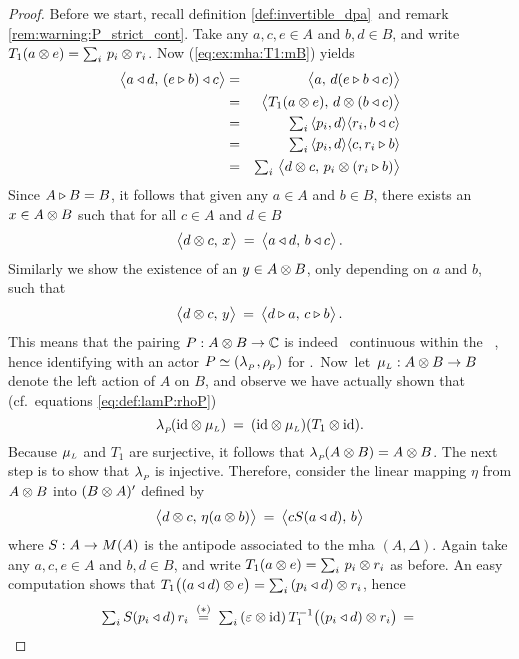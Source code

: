 \begin{proof}
Before we start, recall definition \ref{def:invertible_dpa}\ and
remark \ref{rem:warning:P_strict_cont}\@.
Take any $a,c,e \in A$ and $b,d \in B$, and write $T_1(a \otimes e) = \sum_i\, p_i \otimes r_i$.
Now (\ref{eq:ex:mha:T1:mB}) yields
\begin{eqnarray*}
\pairM{a \ract d}{(e\lact b) \ract c}
  &=&
\pairM{a}{d(e\lact b \ract c)}
\\&=&
\pairM{T_1(a \tens e)}{d \tens (b \ract c)}
\\&=&
\textstyle \sum_i \, \pair{p_i}{d} \pair{r_i}{b \ract c}
\\&=&
\textstyle \sum_i \, \pair{p_i}{d} \pair{c}{r_i \lact b}
\\&=&
\textstyle \sum_i \, \pairM{d\tens c}{p_i \tens (r_i \lact b)}
\end{eqnarray*}
Since $A\triangleright B = B$, it follows that given any $a \in A$ and $b \in B$,
there exists an $x\in A\otimes B$ such that for all  $c \in A$ and $d \in B$
$$ \pairM{d \tens c}{x}  \:=\: \pairM{a \ract d}{b \ract c}. $$
Similarly we show the existence of an $y\in A\otimes B$, only depending on $a$ and $b$,
such that
$$ \pairM{d \tens c}{y}  \:=\:  \pairM{d \lact a}{c \lact b}. $$
This means that the pairing $P : A \otimes B \rightarrow \mathbb{C}$ is indeed \stricta\ continuous
within the \context\ \BBAA, hence identifying with an actor $P \simeq (\lambda_{_P\!}\,,\rho_{_{\!P}})$ for
\mbox{\BBAA\@. Now let}\
$\mu_{\scriptscriptstyle L}:A\otimes B \rightarrow B$ denote the left action of $A$ on $B$, and observe
we have actually shown that (cf.\ equations \ref{eq:def:lamP:rhoP})
$$  \lambda_{_P\!}(\mbox{\rm id} \otimes \mu_{\scriptscriptstyle L})  \:=\:  (\mbox{\rm id} \otimes \mu_{\scriptscriptstyle L})(T_1 \otimes \mbox{\rm id}).  $$
Because $\mu_{\scriptscriptstyle L}$ and $T_1$ are surjective, it follows that $\lambda_{_P\!}(A\otimes B) = A \otimes B$.
The next step is to show that $\lambda_{_P\!}$ is injective.
Therefore, consider the linear mapping $\eta$ from $A\otimes B$ into $(B\otimes A)'$ defined by
\begin{equation}\label{eq:ex:mha:inverse_of_lp}
 \pairM{d \tens c}{\eta(a \tens b)} \:=\: \pairM{c S(a \ract d)}{b}
\end{equation}
where $S:A\rightarrow M(A)$ is the antipode associated to the {\sc mha} $(A,\Delta)$.
Again take any $a,c,e \in A$ and $b,d \in B$,
and write $T_1(a \otimes e) = \sum_i\, p_i \otimes r_i$ as before.
An easy computation shows that
$T_1 \! \left((a\ract d) \tens e \vertM\right) = \sum_i\, (p_i\ract d) \tens r_i$,
hence
$$  \textstyle \sum_i  S(p_i \ract d) \, r_i
           \;\stackrel{(*)}{=}\;
    \textstyle \sum_i \, (\eps \tens \id)\, T_1^{-1} \!\left((p_i\ract d) \tens r_i \vertM\right)
    \,=\:
$$
\end{proof}
